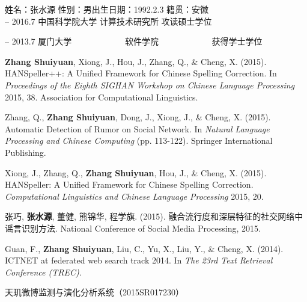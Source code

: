\begin{resume}

\newcommand\tab[1][1cm]{\hspace*{#1}}

\noindent
姓名：张水源 \tab 性别：男\tab  出生日期：1992.2.3 \tab  籍贯：安徽\\

 -- 2016.7  \tab  中国科学院大学 \tab 计算技术研究所 \tab  攻读硕士学位

 -- 2013.7   \tab 厦门大学~~~~~~~~~~~~  \tab 软件学院~~~~~~~~~~~~ \tab  获得学士学位

  \begin{enumerate}[{[}1{]}]
 \item  \textbf{Zhang Shuiyuan}, Xiong, J., Hou, J., Zhang, Q., \& Cheng, X. (2015). HANSpeller++: A Unified Framework for Chinese Spelling Correction. In \emph{Proceedings of the Eighth SIGHAN Workshop on Chinese Language Processing} 2015, 38. Association for Computational Linguistics.

 \item  Zhang, Q., \textbf{Zhang Shuiyuan}, Dong, J., Xiong, J., \& Cheng, X. (2015). Automatic Detection of Rumor on Social Network. In \emph{Natural Language Processing and Chinese Computing} (pp. 113-122). Springer International Publishing.

 \item  Xiong, J., Zhang, Q., \textbf{Zhang Shuiyuan}, Hou, J., \& Cheng, X. (2015). HANSpeller: A Unified Framework for Chinese Spelling Correction. \emph{Computational Linguistics and Chinese Language Processing} 2015, 20.

\item  张巧, \textbf{张水源}, 董健, 熊锦华, 程学旗. (2015). 融合流行度和深层特征的社交网络中谣言识别方法. National Conference of Social Media Processing, 2015.

 \item  Guan, F., \textbf{Zhang Shuiyuan}, Liu, C., Yu, X., Liu, Y., \& Cheng, X. (2014). ICTNET at federated web search track 2014. In \emph{The 23rd Text Retrieval Conference (TREC)}.

\end{enumerate}

\begin{enumerate}[{[}1{]}]
 \item 天玑微博监测与演化分析系统（2015SR017230）


\end{enumerate}
\end{resume}
